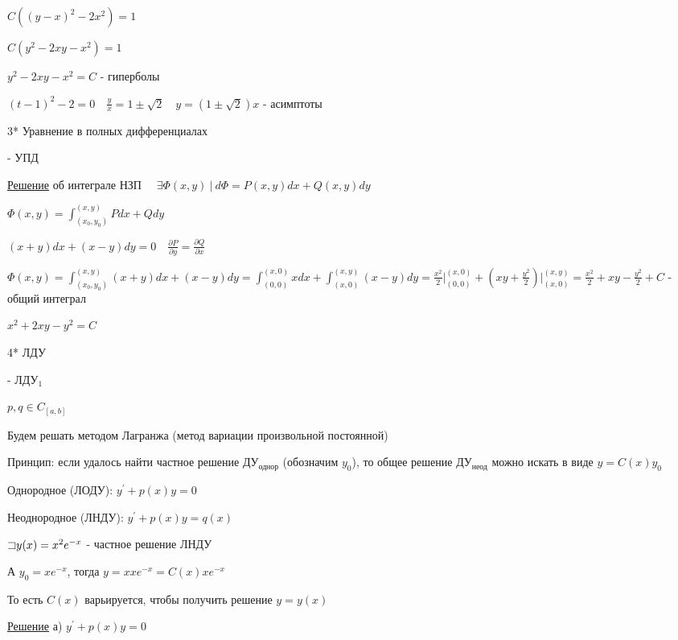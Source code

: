 \documentclass[12pt]{article}
\begin{document}
    $C ((y - x)^2 - 2x^2) = 1$

    $C (y^2 - 2xy - x^2) = 1$

    $y^2 - 2xy - x^2 = C$ - гиперболы

    $(t - 1)^2 - 2 = 0 \quad \frac{y}{x} = 1 \pm \sqrt{2} \quad y = (1 \pm \sqrt{2})x$ - асимптоты

    3* Уравнение в полных дифференциалах

    \Def {} - УПД

    \vspace{5mm}

    \underline{Решение} \Mems \Ths об интеграле НЗП $\quad \exists \Phi(x, y)\ | \ d\Phi = P(x, y)dx + Q(x, y)dy$

    $\Phi(x, y) = \int^{(x,y)}_{(x_0,y_0)} Pdx + Qdy$

    \Ex $(x + y)dx + (x - y)dy = 0 \quad \frac{\partial P}{\partial y} = \frac{\partial Q}{\partial x}$

    $\Phi(x, y) = \int^{(x, y)}_{(x_0,y_0)} (x + y)dx + (x - y)dy =
    \int^{(x,0)}_{(0,0)} xdx + \int^{(x,y)}_{(x,0)} (x - y)dy = \frac{x^2}{2} \Big|_{(0, 0)}^{(x, 0)} +
    (xy + \frac{y^2}{2}) \Big|_{(x, 0)}^{(x, y)} = \frac{x^2}{2} + xy - \frac{y^2}{2} + C$ - общий интеграл

    $x^2 + 2xy - y^2 = C$

    4* ЛДУ

    \Def {} - ЛДУ$_1$

    $p, q \in C_{[a, b]}$

    \Nota Будем решать методом Лагранжа (метод вариации произвольной постоянной)

    Принцип: если удалось найти частное решение ДУ$_\text{однор}$ (обозначим $y_0$), то общее решение ДУ$_\text{неод}$
    можно искать в виде $y = C(x)y_0$

    \Def Однородное (ЛОДУ): $y^\prime + p(x)y = 0$

    \Def Неоднородное (ЛНДУ): $y^\prime + p(x)y = q(x)$

    \Ex $\mathord{\sqsupset} y(x) = x^2 e^{-x}$ - частное решение ЛНДУ

    А $y_0 = x e^{-x}$, тогда $y = x xe^{-x} = C(x) x e^{-x}$

    То есть $C(x)$ варьируется, чтобы получить решение $y = y(x)$

    \underline{Решение} а) $y^\prime + p(x)y = 0$
\end{document}
